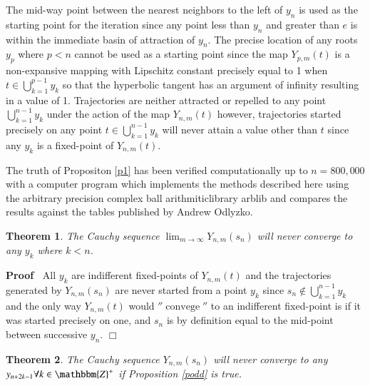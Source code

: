 \documentclass{elsarticle}
\newcommand{\nin}{\not\in}
\newcommand{\tmop}[1]{\ensuremath{\operatorname{#1}}}
\newenvironment{proof}{\noindent\textbf{Proof\ }}{\hspace*{\fill}$\Box$\medskip}
\newtheorem{theorem}{Theorem}
\begin{document}
\begin{remark}
  The mid-way point between the nearest neighbors to the left of $y_n$ is used
  as the starting point for the iteration since any point less than $y_n$ and
  greater than $e$ is within the immediate basin of attraction of $y_n$. The
  precise location of any roots $y_p$ where $p < n$ cannot be used as a
  starting point since the map $Y_{p, m} (t)$ is a non-expansive mapping with
  Lipschitz constant precisely equal to 1 when $t \in \bigcup^{p - 1}_{k = 1}
  y_k$ so that the hyperbolic tangent has an argument of infinity resulting in
  a value of 1. Trajectories are neither attracted or repelled to any point
  $\bigcup^{n - 1}_{k = 1} y_k$ under the action of the map $Y_{n, m} (t)$
  however, trajectories started precisely on any point $t \in \bigcup^{n -
  1}_{k = 1} y_k$ will never attain a value other than $t$ since any $y_k$ is
  a fixed-point of $Y_{n, m} (t)$. 
\end{remark}

\begin{note}
  The truth of Propositon \ref{p1} has been verified computationally up to $n
  = 800, 000$ with a computer program which implements the methods described
  here using the arbitrary precision complex ball arithmiticlibrary
  arblib{\cite{Johansson2013arb}} and compares the results against the tables
  published by Andrew Odlyzko{\cite{zt}}. 
\end{note}

\begin{theorem}
  The Cauchy sequence $\lim_{m \rightarrow \infty} Y_{n, m} (s_n)$ will never
  converge to any $y_k$ where $k < n$. 
\end{theorem}

\begin{proof}
  All $y_k$ are indifferent fixed-points of $Y_{n, m} (t)$ and the
  trajectories generated by $Y_{n, m} (s_n)$ are never started from a point
  $y_k$ since $s_n \nin \bigcup_{k = 1}^{n - 1} y_k$ and the only way $Y_{n,
  m} (t)$ would $'' \tmop{convege}''$ to an indifferent fixed-point is if it
  was started precisely on one, and $s_n$ is by definition equal to the
  mid-point between successive $y_n$.
\end{proof}

\begin{theorem}
  \label{pc}The Cauchy sequence $Y_{n, m} (s_n)$ will never converge to any
  $y_{n + 2 k - 1} \forall k \in \mathbbm{Z}^+$ if Proposition \ref{podd} is
  true.
\end{theorem}
\end{document}
